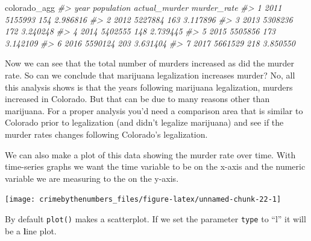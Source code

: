 \documentclass[
  12pt,
]{book}
\newenvironment{Shaded}{\begin{snugshade}}{\end{snugshade}}
\newcommand{\CommentTok}[1]{\textcolor[rgb]{0.37,0.37,0.37}{\textit{#1}}}
\newcommand{\DataTypeTok}[1]{\textcolor[rgb]{0.27,0.27,0.27}{#1}}
\newcommand{\KeywordTok}[1]{\textcolor[rgb]{0.27,0.27,0.27}{\textbf{#1}}}
\newcommand{\NormalTok}[1]{#1}
\newcommand{\OperatorTok}[1]{\textcolor[rgb]{0.43,0.43,0.43}{\textbf{#1}}}
\newcommand{\StringTok}[1]{\textcolor[rgb]{0.5,0.5,0.5}{#1}}
\begin{document}
\begin{Shaded}
\begin{Highlighting}[]
\NormalTok{colorado\_agg}
\CommentTok{\#\textgreater{}   year population actual\_murder murder\_rate}
\CommentTok{\#\textgreater{} 1 2011    5155993           154    2.986816}
\CommentTok{\#\textgreater{} 2 2012    5227884           163    3.117896}
\CommentTok{\#\textgreater{} 3 2013    5308236           172    3.240248}
\CommentTok{\#\textgreater{} 4 2014    5402555           148    2.739445}
\CommentTok{\#\textgreater{} 5 2015    5505856           173    3.142109}
\CommentTok{\#\textgreater{} 6 2016    5590124           203    3.631404}
\CommentTok{\#\textgreater{} 7 2017    5661529           218    3.850550}
\end{Highlighting}
\end{Shaded}

Now we can see that the total number of murders increased as did the murder rate. So can we conclude that marijuana legalization increases murder? No, all this analysis shows is that the years following marijuana legalization, murders increased in Colorado. But that can be due to many reasons other than marijuana. For a proper analysis you'd need a comparison area that is similar to Colorado prior to legalization (and didn't legalize marijuana) and see if the murder rates changes following Colorado's legalization.

We can also make a plot of this data showing the murder rate over time. With time-series graphs we want the time variable to be on the x-axis and the numeric variable we are measuring to the on the y-axis.

\begin{Shaded}
\end{Shaded}

\begin{center}\texttt{[image: crimebythenumbers\_files/figure-latex/unnamed-chunk-22-1]} \end{center}

By default \texttt{plot()} makes a scatterplot. If we set the parameter \texttt{type} to ``l'' it will be a \textbf{l}ine plot.

\begin{Shaded}
\end{Shaded}
\end{document}
